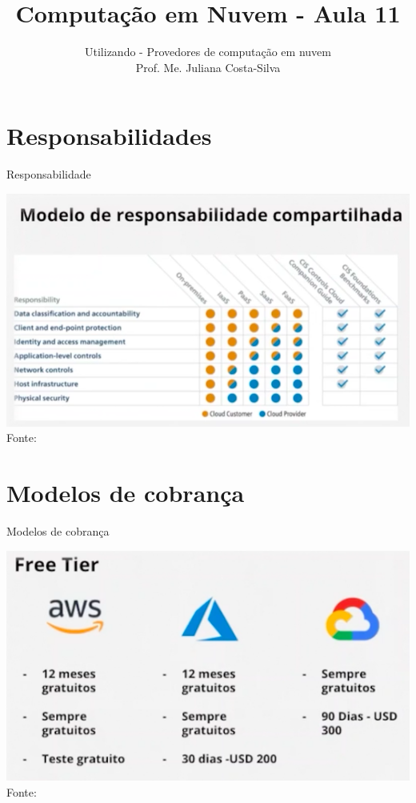 \documentclass{beamer}
\title{Computação em Nuvem - Aula 11}
\subtitle{Utilizando - Provedores de computação em nuvem \\
Prof. Me. Juliana Costa-Silva}
\begin{document}
\frame{
 \titlepage
}

\section{Responsabilidades}
\begin{frame}{Responsabilidade}

\begin{center}
	\includegraphics[width=0.85\paperheight]{fig/aula11/responsabilidade.png} \\
	Fonte: \cite{malheiros2019cc}
      \end{center}
    
\end{frame}
\section{Modelos de cobrança}
\begin{frame}{Modelos de cobrança}

\begin{center}
	\includegraphics[height=0.65\paperheight]{fig/aula11/cobranca.png} \\
	Fonte: \cite{malheiros2019cc}
      \end{center}
    
\end{frame}
\end{document}
